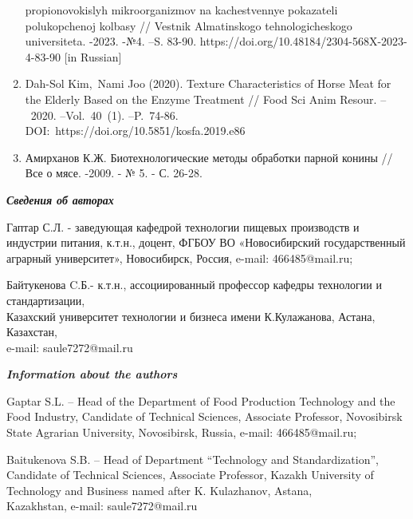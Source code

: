 \begin{noparindent}
\begin{enumerate}
  propionovokislyh mikroorganizmov na kachestvennye pokazateli
  polukopchenoj kolbasy // Vestnik Almatinskogo tehnologicheskogo
  universiteta. -2023. -№4. --S. 83-90.
  https://doi.org/10.48184/2304-568X-2023-4-83-90 {[}in Russian{]}
\item
  Dah-Sol Kim,~Nami Joo (2020). Texture Characteristics of Horse Meat
  for the Elderly Based on the Enzyme Treatment // Food Sci Anim Resour.
  --~2020. --Vol.~40~(1). --P.~74-86. \\ DOI:~https://doi.org/10.5851/kosfa.2019.e86
\item
  Амирханов К.Ж. Биотехнологические методы обработки парной конины //
  Все о мясе. -2009. - № 5. - С. 26-28.
\end{enumerate}
\end{noparindent}

\emph{{\bfseries Сведения об авторах}}
\begin{noparindent}

Гаптар С.Л. - заведующая кафедрой технологии пищевых производств и
индустрии питания, к.т.н., доцент, ФГБОУ ВО «Новосибирский
государственный аграрный университет», Новосибирск, Россия, e-mail:
466485@mail.ru;

Байтукенова C.Б.- к.т.н., ассоциированный профессор кафедры технологии и
стандартизации, \\Казахский университет технологии и бизнеса имени
К.Кулажанова, Астана, Казахстан, \\e-mail: saule7272@mail.ru
\end{noparindent}

\emph{{\bfseries Information about the authors}}
\begin{noparindent}

Gaptar S.L. -- Head of the Department of Food Production Technology and
the Food Industry, Candidate of Technical Sciences, Associate Professor,
Novosibirsk State Agrarian University, Novosibirsk, Russia, e-mail:
466485@mail.ru;

Baitukenova S.B. -- Head of Department ``Technology and
Standardization'', Candidate of Technical Sciences, Associate Professor,
Kazakh University of Technology and Business named after K. Kulazhanov,
Astana,\\Kazakhstan, e-mail: saule7272@mail.ru
\end{noparindent}

